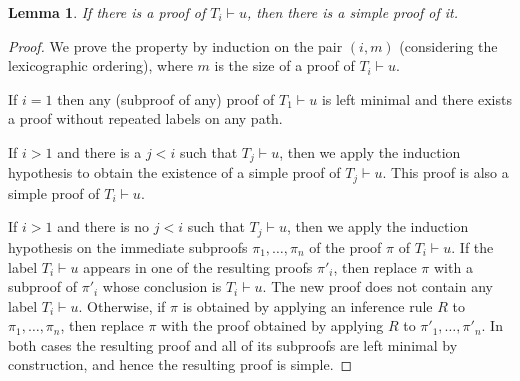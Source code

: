 \documentclass[acmtocl,acmnow]{acmtrans2m}
\newtheorem{lemma}[theorem]{Lemma}
\begin{document}
\begin{lemma}\label{lemma_leftminproof}
If there is a proof of $T_i\vdash u$, then there is a simple proof of it.
\end{lemma}
\begin{proof}
We prove the property by induction on the pair $(i,m)$ (considering
 the lexicographic ordering), where $m$ is the size of a proof
of $T_i\vdash u$.

If $i=1$ then any (subproof of any) proof of $T_1\vdash u$ is left minimal and there exists a proof
without repeated labels on any path.

If $i>1$ and there is a $j<i$ such that $T_j\vdash u$, then we apply the
induction hypothesis to obtain the existence of a simple proof of
$T_j\vdash u$. This proof is also a simple proof of $T_i\vdash u$.

If $i>1$ and there is no $j<i$ such that $T_j\vdash u$, then we apply the
induction hypothesis on the immediate subproofs $\pi_1,\ldots,\pi_n$ of the proof $\pi$ of
$T_i\vdash u$. If the label $T_i\vdash u$ appears in one of the
resulting proofs $\pi'_i$, then replace $\pi$ with a subproof of $\pi'_i$ whose
conclusion is $T_i\vdash u$. The new proof does not contain any label  
$T_i\vdash u$.
Otherwise, if $\pi$ is obtained by applying an inference rule $R$ to $\pi_1,\ldots,\pi_n$, then replace $\pi$ with the proof obtained by applying $R$ to
$\pi'_1,\ldots,\pi'_n$.
In both cases the resulting proof and all of its subproofs are left
minimal by construction, and hence the resulting proof is simple.
\end{proof}
\end{document}
